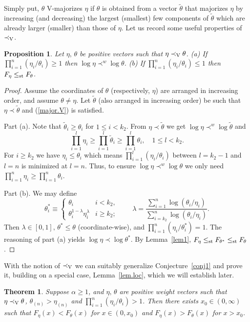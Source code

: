 \documentclass[11pt]{article}
\newtheorem{theorem}{\bf Theorem}
\newtheorem{proposition}{\bf Proposition}
\begin{document}
Simply put, $\theta$ V-majorizes $\eta$ if $\theta$ is obtained from a vector $\tilde{\theta}$ that majorizes $\eta$ by increasing (and decreasing) the largest (smallest) few components of $\tilde{\theta}$ which are already larger (smaller) than those of $\eta$.  Let us record some useful properties of $\prec_{\rm V}$.
\begin{proposition}
\label{prop.V}
Let $\eta,\, \theta$ be positive vectors such that $\eta\prec_{\rm V} \theta$.  (a) If $\prod_{i=1}^n (\eta_i/\theta_i) \geq 1$ then $\log \eta \prec^w \log\theta$.  (b) If $\prod_{i=1}^n (\eta_i/\theta_i) \leq 1$ then $F_\eta \leq_{\rm st} F_\theta$. 
\end{proposition}
\begin{proof}
Assume the coordinates of $\theta$ (respectively, $\eta$) are arranged in increasing order, and assume $\theta\neq \eta$.  Let $\tilde{\theta}$ (also arranged in increasing order) be such that $\eta\prec \tilde{\theta}$ and (\ref{major.V}) is satisfied.  

Part (a). Note that $\tilde{\theta}_i \geq \theta_i$ for $1\leq i<k_2$.  From $\eta\prec\tilde{\theta}$ we get $\log\eta\prec^w \log\tilde{\theta}$ and 
$$\prod_{i=1}^l \eta_i \geq \prod_{i=1}^l \tilde{\theta}_i \geq \prod_{i=1}^l \theta_i,\quad 1\leq l<k_2.
$$
For $i\geq k_2$ we have $\eta_i \leq \theta_i$ which means $\prod_{i=1}^l (\eta_i /\theta_i)$ between $l=k_2-1$ and $l=n$ is minimized at $l=n$.  Thus, to ensure $\log \eta \prec^w \log \theta$ we only need $\prod_{i=1}^n \eta_i \geq \prod_{i=1}^n \theta_i$. 

Part (b). We may define 
$$\theta^*_i \equiv \begin{cases} 
\theta_i & i< k_2, \\
\theta_i^{1-\lambda} \eta_i^{\lambda} & i\geq k_2;
\end{cases}
\quad \quad 
\lambda = \frac{\sum_{i=1}^n \log (\theta_i/\eta_i) }{\sum_{i=k_2}^n \log (\theta_i / \eta_i)}.$$ 
Then $\lambda\in [0, 1],\, \theta^*\leq \theta$ (coordinate-wise), and $\prod_{i=1}^n (\eta_i/\theta^*_i) = 1$. The reasoning of part (a) yields $\log\eta \prec \log \theta^*$.  By Lemma~\ref{lem1}, $F_\eta\leq_{\rm st} F_{\theta^*}\leq_{\rm st} F_\theta$. 
\end{proof}

With the notion of $\prec_{\rm V}$ we can suitably generalize Conjecture~\ref{conj1} and prove it, building on a special case, Lemma~\ref{lem.loc}, which we will establish later. 
\begin{theorem}
\label{s.main}
Suppose $\alpha\geq 1$, and $\eta,\, \theta$ are positive weight vectors such that $\eta \prec_{\rm V} \theta$, $\theta_{(n)}> \eta_{(n)}$ and $\prod_{i=1}^n (\eta_i/\theta_i) >1$.  Then there exists $x_0\in (0, \infty)$ such that $F_\eta(x) < F_\theta(x)$ for $x\in (0, x_0)$ and 
$F_\eta(x) > F_\theta(x)$ for $x>x_0$. 
\end{theorem}
\end{document}
